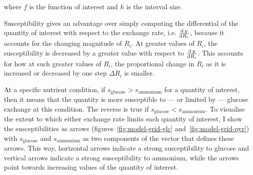 where $f$ is the function of interest and $h$ is the interval size.

Susceptibility gives an advantage over simply computing the differential of the quantity of interest with respect to the exchange rate, i.e. $\frac{\mathrm{d} \, y}{\mathrm{d} R_{i}}$, because it accounts for the changing magnitude of $R_{i}$.
At greater values of $R_{i}$, the susceptibility is decreased by a greater value with respect to $\frac{\mathrm{d} \, y}{\mathrm{d} R_{i}}$.
This accounts for how at such greater values of $R_{i}$, the proportional change in $R_{i}$ as it is increased or decreased by one step $\Delta R_{i}$ is smaller.

At a specific nutrient condition, if $s_{\mathrm{glucose}} > s_{\mathrm{ammonium}}$ for a quantity of interest, then it means that the quantity is more susceptible to --- or limited by --- glucose exchange at this condition.
The reverse is true if $s_{\mathrm{glucose}} < s_{\mathrm{ammonium}}$.
To visualise the extent to which either exchange rate limits each quantity of interest, I show the susceptibilities as arrows (figures~\ref{fig:model-grid-glc} and~\ref{fig:model-grid-pyr}) with $s_{\mathrm{glucose}}$ and $s_{\mathrm{ammonium}}$ as two components of the vector that defines these arrows.
This way, horizontal arrows indicate a strong susceptibility to glucose and vertical arrows indicate a strong susceptibility to ammonium, while the arrows point towards increasing values of the quantity of interest.

